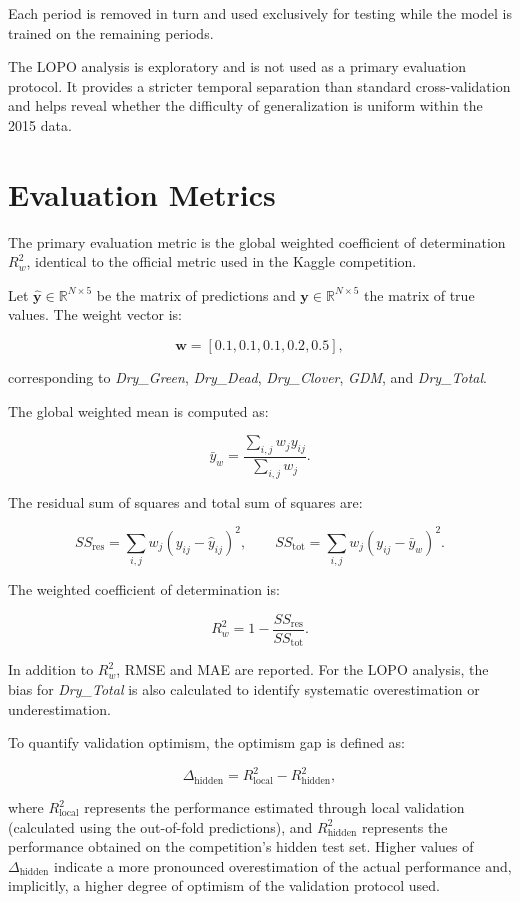 Each period is removed in turn and used exclusively for testing while the model is trained on the remaining periods.

The LOPO analysis is exploratory and is not used as a primary evaluation protocol. It provides a stricter temporal separation than standard cross-validation and helps reveal whether the difficulty of generalization is uniform within the 2015 data.

\section{Evaluation Metrics}

The primary evaluation metric is the global weighted coefficient of determination $R^2_w$, identical to the official metric used in the Kaggle competition.

Let $\hat{\mathbf{y}} \in \mathbb{R}^{N \times 5}$ be the matrix of predictions and $\mathbf{y} \in \mathbb{R}^{N \times 5}$ the matrix of true values. The weight vector is:

\[
\mathbf{w} = [0.1, 0.1, 0.1, 0.2, 0.5],
\]

corresponding to \textit{Dry\_Green}, \textit{Dry\_Dead}, \textit{Dry\_Clover}, \textit{GDM}, and \textit{Dry\_Total}.

The global weighted mean is computed as:

\[
\bar{y}_w =
\frac{\sum_{i,j} w_j y_{ij}}
     {\sum_{i,j} w_j}.
\]

The residual sum of squares and total sum of squares are:

\[
SS_{\text{res}} =
\sum_{i,j} w_j (y_{ij} - \hat{y}_{ij})^2,
\qquad
SS_{\text{tot}} =
\sum_{i,j} w_j (y_{ij} - \bar{y}_w)^2.
\]

The weighted coefficient of determination is:

\[
R^2_w =
1 - \frac{SS_{\text{res}}}{SS_{\text{tot}}}.
\]

In addition to $R^2_w$, RMSE and MAE are reported. For the LOPO analysis, the bias for \textit{Dry\_Total} is also calculated to identify systematic overestimation or underestimation.

To quantify validation optimism, the optimism gap is defined as:

\[
\Delta_{\text{hidden}} =
R^2_{\text{local}} - R^2_{\text{hidden}},
\]

where $R^2_{\text{local}}$ represents the performance estimated through local validation (calculated using the out-of-fold predictions), and $R^2_{\text{hidden}}$ represents the performance obtained on the competition's hidden test set. Higher values of $\Delta_{\text{hidden}}$ indicate a more pronounced overestimation of the actual performance and, implicitly, a higher degree of optimism of the validation protocol used.

